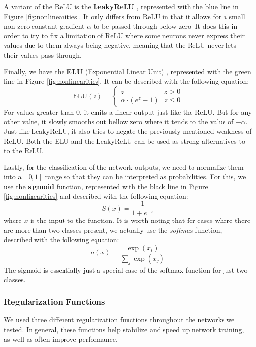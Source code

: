 \documentclass[times, utf8, diplomski, english]{fer_eng}
\begin{document}
A variant of the ReLU is the \textbf{LeakyReLU} \cite{leakyrelu}, represented with the blue line in Figure \ref{fig:nonlinearities}. It only differs from ReLU in that it allows for a small non-zero constant gradient $\alpha$ to be passed through below zero. It does this in order to try to fix a limitation of ReLU where some neurons never express their values due to them always being negative, meaning that the ReLU never lets their values pass through.

Finally, we have the \textbf{ELU} (Exponential Linear Unit) \cite{elu}, represented with the green line in Figure \ref{fig:nonlinearities}. It can be described with the following equation:
\[ \mathrm{ELU}(z) = \begin{cases} 
z & z > 0 \\
\alpha \cdot (e^z - 1) & z \leq 0
\end{cases} \]
For values greater than 0, it emits a linear output just like the ReLU. But for any other value, it slowly smooths out bellow zero where it tends to the value of $- \alpha$. Just like LeakyReLU, it also tries to negate the previously mentioned weakness of ReLU. Both the ELU and the LeakyReLU can be used as strong alternatives to to the ReLU.

Lastly, for the classification of the network outputs, we need to normalize them into a $[0, 1]$ range so that they can be interpreted as probabilities. For this, we use the \textbf{sigmoid} function, represented with the black line in Figure \ref{fig:nonlinearities} and described with the following equation:
\[ S(x) = \frac{1}{1 + e^{-x}} \]
where $x$ is the input to the function. It is worth noting that for cases where there are more than two classes present, we actually use the \textit{softmax} function, described with the following equation:
\[ \sigma(x) = \frac{\exp (x_i)}{\sum_j \exp (x_j)} \]
The sigmoid is essentially just a special case of the softmax function for just two classes.

\subsubsection{Regularization Functions}
\label{subsubsec:regularization functions}

We used three different regularization functions throughout the networks we tested. In general, these functions help stabilize and speed up network training, as well as often improve performance.
\end{document}
